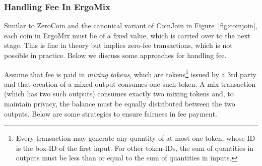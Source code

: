 \documentclass[11pt]{article}
\newcommand{\mixname}{ErgoMix\xspace}
\begin{document}
\subsubsection{Handling Fee In \mixname}

Similar to ZeroCoin and the canonical variant of CoinJoin in Figure~\ref{fig:coinjoin}, each coin in \mixname must be of a fixed value, which is carried over to the next stage. 
This is fine in theory but implies zero-fee transactions, which is not possible in practice. Below we discuss some approaches for handling fee. 

Assume that fee is paid in {\em mixing tokens}, which are tokens\footnote{Every transaction may generate any quantity of at most one token, whose ID is the box-ID of the first input. For other token-IDs, the sum of quantities in outputs must be less than or equal to the sum of quantities in inputs.} issued by a 3rd party and that creation of a mixed output consumes one such token. A mix transaction (which has two such outputs) consumes exactly two mixing tokens and, to maintain privacy, the balance must be equally distributed between the two outputs. Below are some strategies to ensure fairness in fee payment. 
\end{document}
